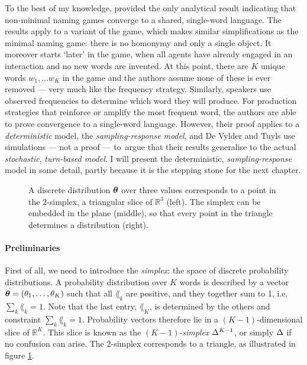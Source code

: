\documentclass{../src/bcthesispart}
\begin{document}
To the best of my knowledge, \textcite{DeVylder2006} provided the only analytical result indicating that non-minimal naming games converge to a shared, single-word language.
The results apply to a variant of the game, which makes similar simplifications as the minimal naming game: there is no homonymy and only a single object.
It moreover starts ‘later’ in the game, when all agents have already engaged in an interaction and no new words are invented.
At this point, there are $K$ unique words $w_1, \dots w_K$ in the game and the authors assume none of these is ever removed — very much like the frequency strategy.
Similarly, speakers use observed frequencies to determine which word they will produce.
For production strategies that reinforce or amplify the most frequent word, the authors are able to prove convergence to a single-word language.
However, their proof applies to a \emph{deterministic} model, the \emph{sampling-response model}, and De Vylder and Tuyls use simulations — not a proof — to argue that their results generalise to the actual \emph{stochastic}, \emph{turn-based model}.
I will present the deterministic, \emph{sampling-response} model in some detail, partly because it is the stepping stone for the next chapter.




\begin{SCfigure}
	
	
	\caption{%
	A discrete distribution $\boldsymbol{\mathbf{\theta}}$ over three values corresponds to a point in the $2$-simplex, a triangular slice of $\mathbb{R}^3$ (left).
	The simplex can be embedded in the plane (middle), so that every point in the triangle determines a distribution (right).
	\label{fig:ch3:simplex}
  }
\end{SCfigure}




\paragraph{Preliminaries}

First of all, we need to introduce the \emph{simplex}: the space of discrete probability distributions.
A probability distribution over $K$ words is described by a vector $\boldsymbol{\mathbf{\theta}} = (\theta_1, \dots, \theta_K)$ such that all $\lang_k$ are positive, and they together sum to 1, i.e.\ $\sum_k \lang_k = 1$.
Note that the last entry, $\lang_K$, is determined by the others and constraint $\sum_k \lang_k = 1$.
Probability vectors therefore lie in a $(K-1)$-dimensional slice of $\mathbb{R}^K$.
This slice is known as the $(K-1)$-\emph{simplex} $\Delta^{K-1}$, or simply $\Delta$ if no confusion can arise.
The 2-simplex corresponds to a triangle, as illustrated in figure \ref{fig:ch3:simplex}.
\end{document}
